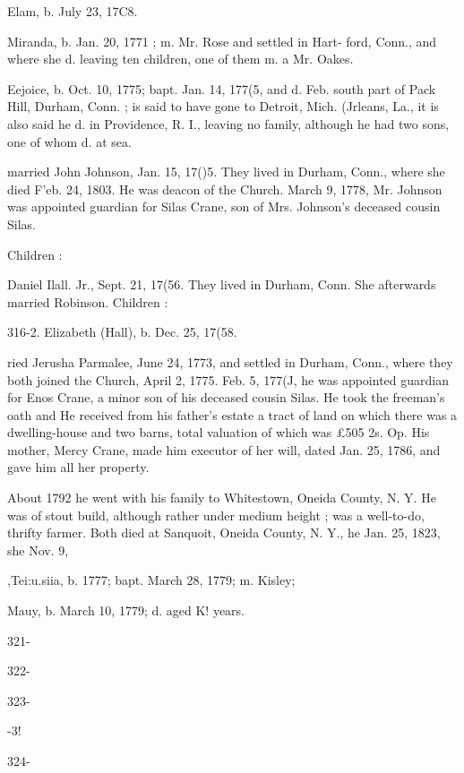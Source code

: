 \documentclass[oneside]{book}
\begin{document}
Elam, b. July 23, 17C8. 

Miranda, b. Jan. 20, 1771 ; m. Mr. Rose and settled in Hart- 
ford, Conn., and where she d. leaving ten children, one of 
them m. a Mr. Oakes. 


Eejoice, b. Oct. 10, 1775; bapt. Jan. 14, 177(5, and d. Feb. 
south part of Pack Hill, Durham, Conn. ; is said to have 
gone to Detroit, Mich. 
(Jrleans, La., it is also said he d. in Providence, R. I., 
leaving no family, although he had two sons, one of whom 
d. at sea. 

married John Johnson, Jan. 15, 17()5. They lived in Durham, 
Conn., where she died F'eb. 24, 1803. He was deacon of the 
Church. March 9, 1778, Mr. Johnson was appointed guardian 
for Silas Crane, son of Mrs. Johnson's deceased cousin Silas. 

Children : 


Daniel Ilall. Jr., Sept. 21, 17(56. They lived in Durham, Conn. 
She afterwards married Robinson. Children : 


316-2. Elizabeth (Hall), b. Dec. 25, 17(58. 




ried Jerusha Parmalee, June 24, 1773, and settled in Durham, 
Conn., where they both joined the Church, April 2, 1775. Feb. 
5, 177(J, he was appointed guardian for Enos Crane, a minor son 
of his deceased cousin Silas. He took the freeman's oath and 
He received from his father's estate a tract of land on which there 
was a dwelling-house and two barns, total valuation of which was 
£505  2s.  Op. His mother, Mercy Crane, made him executor 
of her will, dated Jan. 25, 1786, and gave him all her property. 




About 1792 he went with his family to Whitestown, Oneida 
County, N. Y. He was of stout build, although rather under 
medium height ; was a well-to-do, thrifty farmer. Both died at 
Sanquoit, Oneida County, N. Y., he Jan. 25, 1823, she Nov. 9, 


,Tei:u.siia, b. 1777; bapt. March 28, 1779; m. Kisley; 

Mauy, b. March 10, 1779; d. aged K! years. 



321- 




322- 




323- 


-3! 


324- 
\end{document}

